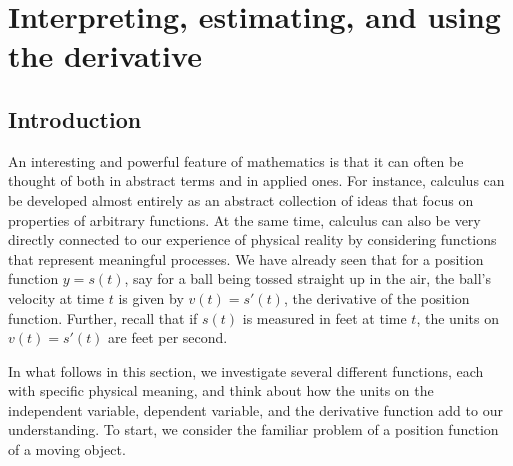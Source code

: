 \section{Interpreting, estimating, and using the derivative} \label{S:1.5.Units}

\vspace*{-14 pt}

\subsection*{Introduction}

An interesting and powerful feature of mathematics is that it can often be thought of both in abstract terms and in applied ones.  For instance, calculus can be developed almost entirely as an abstract collection of ideas that focus on properties of arbitrary functions.  At the same time, calculus can also be very directly connected to our experience of physical reality by considering functions that represent meaningful processes.  We have already seen that for a position function $y = s(t)$, say for a ball being tossed straight up in the air, the ball's velocity at time $t$ is given by $v(t) = s'(t)$, the derivative of the position function.  Further, recall that if $s(t)$ is measured in feet at time $t$, the units on $v(t) = s'(t)$ are feet per second.

In what follows in this section, we investigate several different functions, each with specific physical meaning, and think about how the units on the independent variable, dependent variable, and the derivative function add to our understanding.  To start, we consider the familiar problem of a position function of a moving object.

